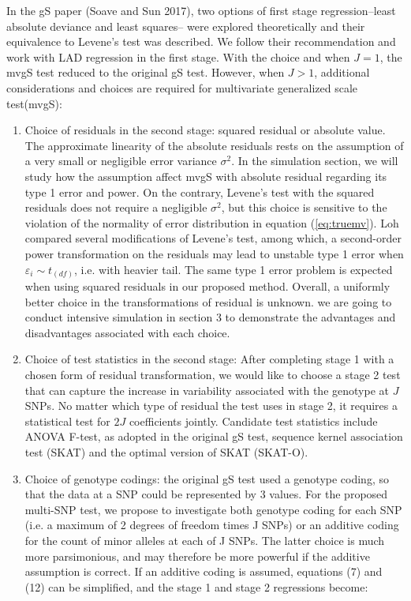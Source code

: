 \documentclass{article}
\begin{document}
In the gS paper (Soave and Sun 2017), two options of first stage regression--least absolute deviance and least squares-- were explored theoretically and their equivalence to Levene's test was described. We follow their recommendation and work with LAD regression in the first stage. With the choice and when $J=1$, the mvgS test reduced to the original gS test. However, when $J>1$, additional considerations and choices are required for multivariate generalized scale test(mvgS):
\begin{enumerate}[(1)]

    \item Choice of residuals in the second stage: squared residual or absolute value. The approximate linearity of the absolute residuals  rests on the assumption of a very small or negligible error variance $\sigma^2$. In the simulation section, we will study how the assumption affect mvgS with absolute residual regarding its type 1 error and power. On the contrary, Levene's test with the squared residuals does not require a negligible $\sigma^2$, but this choice is sensitive to the violation of the normality of error distribution in equation (\ref{eq:truemv}).  Loh\cite{loh1987some} compared several modifications of Levene's test, among which, a second-order power transformation on the residuals  may lead to unstable type 1 error when $\varepsilon_i\sim t_{(df)}$, i.e. with heavier tail. The same type 1 error problem is expected when using squared residuals in our proposed method. Overall, a uniformly better choice in the transformations of residual is unknown.  we are going to conduct intensive simulation in section 3 to demonstrate the advantages and disadvantages associated with each choice.
    
    \item Choice of test statistics in the second stage: After completing stage 1 with a chosen form of residual transformation, we would like to choose a stage 2 test that can capture the increase in variability associated with the genotype at $J$ SNPs. No matter which type of residual the test uses in stage 2, it requires a statistical test for $2J$ coefficients jointly.  Candidate test statistics include ANOVA F-test, as adopted in the original gS test, sequence kernel association test (SKAT) and the optimal version of SKAT (SKAT-O). 
    
    \item Choice of genotype codings: the original gS test used a genotype coding, so that the data at a SNP could be represented by 3 values. For the proposed multi-SNP test, we propose to investigate both genotype coding for each SNP (i.e. a maximum of 2 degrees of freedom times J SNPs) or an additive coding for the count of minor alleles at each of J SNPs. The latter choice is much more parsimonious, and may therefore be more powerful if the additive assumption is correct.  If an additive coding is assumed, equations (7) and (12) can be simplified, and the stage 1 and stage 2 regressions become:


\end{enumerate}
\end{document}
